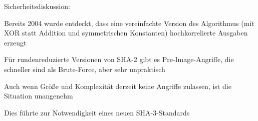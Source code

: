 \documentclass[a4paper]{article}
\begin{document}
\begin{multicols}{3}
\begin{itemize*}
\begin{itemize*}
                  \item Sicherheitsdiskussion:
                  \begin{itemize*}
                        \item Bereits 2004 wurde entdeckt, dass eine vereinfachte Version des Algorithmus (mit XOR statt Addition und symmetrischen Konstanten) hochkorrelierte Ausgaben erzeugt
                        \item Für rundenreduzierte Versionen von SHA-2 gibt es Pre-Image-Angriffe, die schneller sind als Brute-Force, aber sehr unpraktisch
                        \item Auch wenn Größe und Komplexität derzeit keine Angriffe zulassen, ist die Situation unangenehm
                        \item Dies führte zur Notwendigkeit eines neuen SHA-3-Standards
                  \end{itemize*}
            \end{itemize*}
      \end{itemize*}


\end{multicols}
\end{document}

